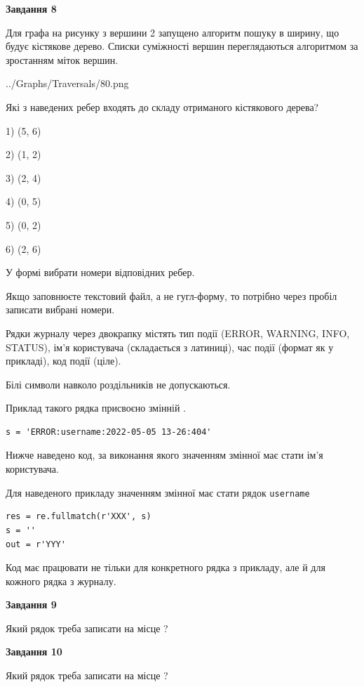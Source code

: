 \documentclass[12pt, ukrainian]{article}
\def\code#1{\Verb!#1!}
\begin{document}
{\begin {large}
{\begin {center}\textbf{Завдання 8}\end {center}}\par
Для графа на рисунку з вершини 2 запущено алгоритм пошуку в ширину, що будує кістякове дерево. Списки суміжності вершин переглядаються алгоритмом за зростанням міток вершин.\par
\begin{center}
	{../Graphs/Traversals/80.png}
\end{center}
\par Які з наведених ребер входять до складу отриманого кістякового дерева?\par
1) (5, 6)\par
2) (1, 2)\par
3) (2, 4)\par
4) (0, 5)\par
5) (0, 2)\par
6) (2, 6)\par
{\vskip 15pt} У формі вибрати номери відповідних ребер.


Якщо заповнюєте текстовий файл, а не гугл-форму, то потрібно через пробіл записа\-ти вибрані номери.\par
\newpage


Рядки журналу через двокрапку містять тип події (ERROR, WARNING, INFO, STATUS), ім'я користувача (складається з латиниці), час події (фор\-мат як у прикладі), код події (ціле).

Білі символи навколо роздільників не допускаються.

Приклад такого рядка присвоєно змінній .



\begin{verbatim}
s = 'ERROR:username:2022-05-05 13-26:404'
\end{verbatim}


Нижче наведено код, за виконання якого значенням змінної  має стати ім'я користувача.

Для наведеного прикладу значенням змінної  має стати рядок \code{username}



\begin{verbatim}
res = re.fullmatch(r'XXX', s)
s = ''
out = r'YYY'
\end{verbatim}


Код має працювати не тільки для конкретного рядка з прикладу, але й для кожного рядка з журналу.

{\begin {center}\textbf{Завдання 9}\end {center}}\par
Який рядок треба записати на місце  ?\par
\vspace{5mm}


{\begin {center}\textbf{Завдання 10}\end {center}}\par
Який рядок треба записати на місце  ?\par


\newpage


\end {large}}
\end{document}
